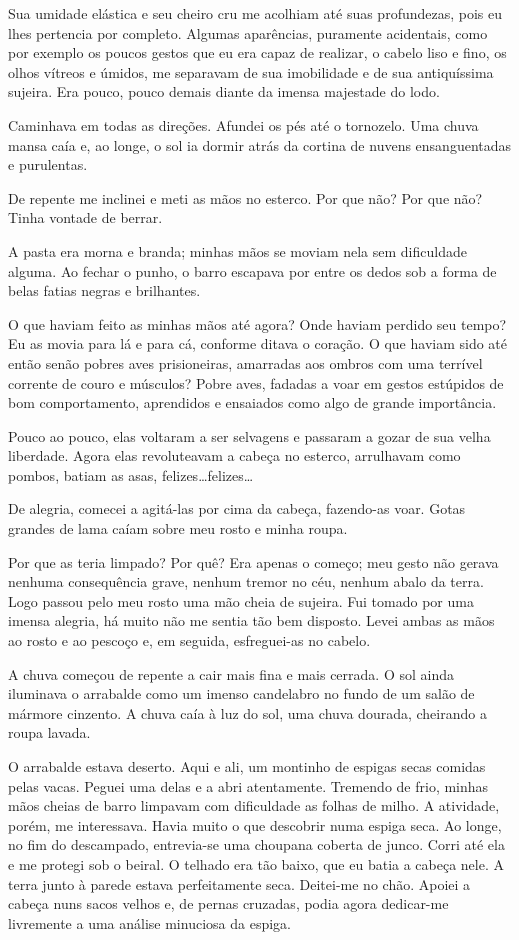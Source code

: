 Sua umidade elástica e seu cheiro cru me acolhiam até suas profundezas, pois eu lhes pertencia por completo. Algumas aparências, puramente acidentais, como por exemplo os poucos gestos que eu era capaz de realizar, o cabelo liso e fino, os olhos vítreos e úmidos, me separavam de sua imobilidade e de sua antiquíssima sujeira. Era pouco, pouco demais diante da imensa majestade do lodo.

Caminhava em todas as direções. Afundei os pés até o tornozelo. Uma chuva mansa caía e, ao longe, o sol ia dormir atrás da cortina de nuvens ensanguentadas e purulentas.

De repente me inclinei e meti as mãos no esterco. Por que não? Por que não? Tinha vontade de berrar.

A pasta era morna e branda; minhas mãos se moviam nela sem dificuldade alguma. Ao fechar o punho, o barro escapava por entre os dedos sob a forma de belas fatias negras e brilhantes.

O que haviam feito as minhas mãos até agora? Onde haviam perdido seu tempo? Eu as movia para lá e para cá, conforme ditava o coração. O que haviam sido até então senão pobres aves prisioneiras, amarradas aos ombros com uma terrível corrente de couro e músculos? Pobre aves, fadadas a voar em gestos estúpidos de bom comportamento, aprendidos e ensaiados como algo de grande importância.

Pouco ao pouco, elas voltaram a ser selvagens e passaram a gozar de sua velha liberdade. Agora elas revoluteavam a cabeça no esterco, arrulhavam como pombos, batiam as asas, felizes\dots felizes\dots

De alegria, comecei a agitá-las por cima da cabeça, fazendo-as voar. Gotas grandes de lama caíam sobre meu rosto e minha roupa.

Por que as teria limpado? Por quê? Era apenas o começo; meu gesto não gerava nenhuma consequência grave, nenhum tremor no céu, nenhum abalo da terra. Logo passou pelo meu rosto uma mão cheia de sujeira. Fui tomado por uma imensa alegria, há muito não me sentia tão bem disposto. Levei ambas as mãos ao rosto e ao pescoço e, em seguida, esfreguei-as no cabelo. 

A chuva começou de repente a cair mais fina e mais cerrada. O sol ainda iluminava o arrabalde como um imenso candelabro no fundo de um salão de mármore cinzento. A chuva caía à luz do sol, uma chuva dourada, cheirando a roupa lavada.

O arrabalde estava deserto. Aqui e ali, um montinho de espigas secas comidas pelas vacas. Peguei uma delas e a abri atentamente. Tremendo de frio, minhas mãos cheias de barro limpavam com dificuldade as folhas de milho. A atividade, porém, me interessava. Havia muito o que descobrir numa espiga seca. Ao longe, no fim do descampado, entrevia-se uma choupana coberta de junco. Corri até ela e me protegi sob o beiral. O telhado era tão baixo, que eu batia a cabeça nele. A terra junto à parede estava perfeitamente seca. Deitei-me no chão. Apoiei a cabeça nuns sacos velhos e, de pernas cruzadas, podia agora dedicar-me livremente a uma análise minuciosa da espiga.

